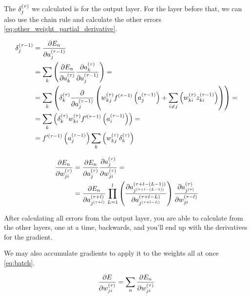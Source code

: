 \documentclass[a4paper,12pt]{article}
\theoremstyle{mytheoremstyle}
\theoremstyle{mytheoremstyle}
\theoremstyle{myproblemstyle}
\begin{document}
    The $ \delta_{j}^{\left( \tau \right)} $ we calculated is for the output layer. For the
    layer before that, we can also use the chain rule and calculate the other
    errors \eqref{eq:other_weight_partial_derivative}.

    \begin{equation}
        \begin{split}
            \delta_{j}^{\left( \tau - {1} \right)} & = \frac{\partial {E_{n}}}{\partial {a_{j}^{\left( \tau - {1} \right)}}} \\
            & = \displaystyle\sum_{k} \left( \frac{\partial {E_{n}}}{\partial {a_{k}^{\left( \tau \right)}}} \frac{\partial {a_{k}^{\left( \tau \right)}}}{\partial {a_{j}^{\left( \tau - {1} \right)}}} \right) = \\
            & = \displaystyle\sum_{k} \left( \delta_{k}^{\left( \tau \right)} \frac{\partial {}}{\partial {a_{j}^{\left( \tau - {1} \right)}}} \left( w_{kj}^{\left( \tau \right)} f^{\left( \tau - {1} \right)} \left( a_{j}^{\left( \tau - {1} \right)} \right) + \displaystyle\sum_{i \neq j} \left( w_{ki}^{\left( \tau \right)} z_{ki}^{\left( \tau - {1} \right)} \right) \right) \right) = \\
            & = \displaystyle\sum_{k} \left( \delta_{k}^{\left( \tau \right)} w_{ki}^{\left( \tau \right)} f^{\prime \left( \tau - {1} \right)} \left( a_{i}^{\left( \tau - {1} \right)} \right)  \right) = \\
            & = f^{\prime \left( \tau - {1} \right)} \left( a_{j}^{\left( \tau - {1} \right)} \right) \displaystyle\sum_{k} \left( w_{kj}^{\left( \tau \right)} \delta_{k}^{\left( \tau \right)} \right)
        \end{split}
        \label{eq:other_weight_partial_derivative}
    \end{equation}

    \begin{equation}
        \begin{split}
            \frac{\partial {E_{n}}}{\partial {w_{ji}^{\left( \tau \right)}}} & = \frac{\partial {E_{n}}}{\partial {a_{j}^{\left( \tau \right)}}} \frac{\partial {a_{j}^{\left( \tau \right)}}}{\partial {w_{ji}^{\left( \tau \right)}}} = \\
            & = \frac{\partial {E_{n}}}{\partial {a_{j^{\left( \tau + {l} \right)}}^{\left( \tau + {l} \right)}}} \displaystyle\prod_{L = 1}^{l} \left( \frac{\partial {a_{j^{\left( \tau + {l - \left( L - 1 \right)} \right)}}^{\left( \tau + {l - \left( L - 1 \right)} \right)}}}{\partial {a_{j^{\left( \tau + {l - L} \right)}}^{\left( \tau + {l - L} \right)}}} \right) \frac{\partial {a_{j^{\left( \tau \right)}}^{\left( \tau \right)}}}{\partial {w_{ji}^{\left( \tau - {l} \right)}}}
        \end{split}
    \end{equation}

    After calculating all errors from the output layer, you are able to
    calculate from the other layers, one at a time, backwards, and you'll end
    up with the derivatives for the gradient.

    We may also accumulate gradients to apply it to the weights all at once
    \eqref{eq:batch}.

    \begin{equation}
        \frac{\partial {E}}{\partial {w_{ji}^{\left( \tau \right)}}} = \displaystyle\sum_{n} \frac{\partial {E_{n}}}{\partial {w_{ji}^{\left( \tau \right)}}}
        \label{eq:batch}
    \end{equation}
\end{document}
